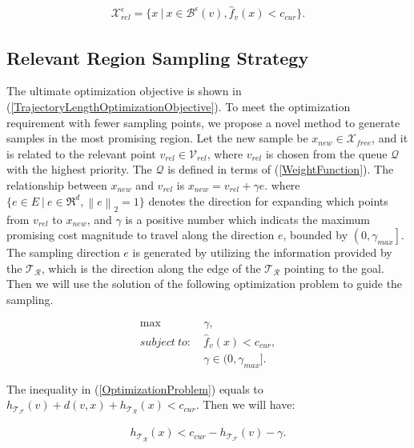 \begin{equation}
\begin{aligned}
\mathcal{X}^{\epsilon}_{rel} = \{x \ | \ x \in \mathcal{B}^{\epsilon}(v), \hat{f}_v(x) < c_{cur} \}.
\label{RelevantRegion}
\end{aligned}
\end{equation}


\subsection{Relevant Region Sampling Strategy}

The ultimate optimization objective is shown in (\ref{TrajectoryLengthOptimizationObjective}).
To meet the optimization requirement with fewer sampling points, we propose a novel method to generate samples in the most promising region.
Let the new sample be $x_{new} \in \mathcal{X}_{free}$, and it is related to the relevant point $v_{rel} \in \mathcal{V}_{rel}$, where $v_{rel}$ is chosen from the queue $\mathcal{Q}$ with the highest priority.
The $\mathcal{Q}$ is defined in terms of (\ref{WeightFunction}). 
The relationship between $x_{new}$ and $v_{rel}$ is $x_{new} = v_{rel} + \gamma e$.
where $\{ e\in E \ | \ e \in \Re^d, \left\| e \right\|_2 = 1\}$ denotes the direction for expanding which points from $v_{rel}$ to $x_{new}$, and $\gamma$ is a positive number which indicats the maximum promising cost magnitude to travel along the direction $e$, bounded by $\left(0, \gamma_{max} \right]$.
The sampling direction $e$ is generated by utilizing the information provided by the $\mathcal{T}_{\mathcal{R}}$, which is the direction along the edge of the $\mathcal{T}_{\mathcal{R}}$ pointing to the goal. 
Then we will use the solution of the following optimization problem to guide the sampling.

\begin{equation}
\begin{aligned}
\max & \ \gamma, \\
subject \ to: & \ \hat{f}_v(x) < c_{cur}, \\
& \ \gamma \in (0, \gamma_{max}].
\label{OptimizationProblem}
\end{aligned}
\end{equation}

The inequality in (\ref{OptimizationProblem}) equals to $h_{\mathcal{T}_{\mathcal{F}}}(v) + d(v, x) + h_{\mathcal{T}_{\mathcal{R}}}(x) < c_{cur}$. Then we will have:

\begin{equation}
\begin{aligned}
h_{\mathcal{T}_{\mathcal{R}}}(x) < c_{cur} - h_{\mathcal{T}_{\mathcal{F}}}(v) - \gamma.
\label{Reformate_1}
\end{aligned}
\end{equation}

